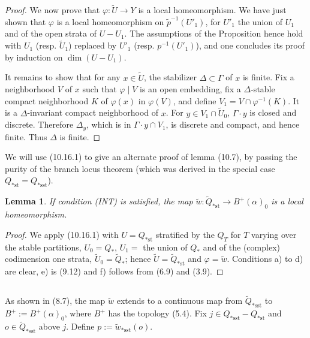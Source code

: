 \documentclass[12pt,a4paper]{article}
\theoremstyle{plain}
\newtheorem{lemma}[theorem]{Lemma}
\theoremstyle{definition}
\theoremstyle{remark}
\begin{document}
\begin{proof}
We now prove that $\varphi : \widetilde{U} \to Y$ is a local homeomorphism. We have just shown that $\varphi$ is a local homeomorphism on $\widetilde{p}^{-1}(U'_1)$, for $U'_1$ the union of $U_1$ and of the open strata of $U - U_1$. The assumptions of the Proposition hence hold with $U_1$ (resp. $\widetilde{U}_1$) replaced by $U'_1$ (resp. $p^{-1}(U'_1)$), and one concludes its proof by induction on $\dim(U - U_1)$.

It remains to show that for any $x \in \widetilde{U}$, the stabilizer $\Delta \subset \Gamma$ of $x$ is finite. Fix a neighborhood $V$ of $x$ such that $\varphi \mid V$ is an open embedding, fix a $\Delta$-stable compact neighborhood $K$ of $\varphi(x)$ in $\varphi(V)$, and define $V_1 = V \cap \varphi^{-1}(K)$. It is a $\Delta$-invariant compact neighborhood of $x$. For $y \in V_1 \cap \widetilde{U}_0$, $\Gamma \cdot y$ is closed and discrete. Therefore $\Delta_y$, which is in $\Gamma \cdot y \cap V_1$, is discrete and compact, and hence finite. Thus $\Delta$ is finite.
\end{proof}

We will use (10.16.1) to give an alternate proof of lemma (10.7), by passing the purity of the branch locus theorem (which was derived in the special case $Q_{*\text{st}} = Q_{*\text{sst}}$).

\begin{lemma}
\label{10.17}
If condition (INT) is satisfied, the map $\widetilde{w} : \widetilde{Q}_{*\text{st}} \to B^+(\alpha)_0$ is a local homeomorphism.
\end{lemma}

\begin{proof}
We apply (10.16.1) with $U = Q_{*\text{st}}$ stratified by the $Q_T$ for $T$ varying over the stable partitions, $U_0 = Q_*$, $U_1 =$ the union of $Q_*$ and of the (complex) codimension one strata, $\widetilde{U}_0 = \widetilde{Q}_*$; hence $\widetilde{U} = \widetilde{Q}_{*\text{st}}$ and $\varphi = \widetilde{w}$. Conditions a) to d) are clear, e) is (9.12) and f) follows from (6.9) and (3.9).
\end{proof}

\subsection{}
\label{10.18}

As shown in (8.7), the map $\widetilde{w}$ extends to a continuous map from $\widetilde{Q}_{*\text{sst}}$ to $B^+ := B^+(\alpha)_0$, where $B^+$ has the topology (5.4). Fix $j \in Q_{*\text{sst}} - Q_{*\text{st}}$ and $o \in \widetilde{Q}_{*\text{sst}}$ above $j$. Define $p := \widetilde{w}_{*\text{sst}}(o)$.
\end{document}
